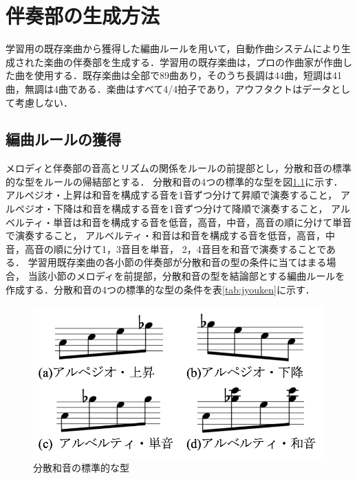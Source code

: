 \chapter{伴奏部の生成方法}
学習用の既存楽曲から獲得した編曲ルールを用いて，自動作曲システムにより生成された楽曲の伴奏部を生成する．学習用の既存楽曲は，プロの作曲家が作曲した曲を使用する．既存楽曲は全部で89曲あり，そのうち長調は44曲，短調は41曲，無調は4曲である．楽曲はすべて4/4拍子であり，アウフタクトはデータとして考慮しない．

\section{編曲ルールの獲得}
メロディと伴奏部の音高とリズムの関係をルールの前提部とし，分散和音の標準的な型をルールの帰結部とする．
分散和音の4つの標準的な型を図\ref{fig:type}に示す．アルペジオ・上昇は和音を構成する音を1音ずつ分けて昇順で演奏すること，
アルペジオ・下降は和音を構成する音を1音ずつ分けて降順で演奏すること，
アルベルティ・単音は和音を構成する音を低音，高音，中音，高音の順に分けて単音で演奏すること，
アルベルティ・和音は和音を構成する音を低音，高音，中音，高音の順に分けて1，3音目を単音，
2，4音目を和音で演奏することである．
学習用既存楽曲の各小節の伴奏部が分散和音の型の条件に当てはまる場合，
当該小節のメロディを前提部，分散和音の型を結論部とする編曲ルールを作成する．分散和音の4つの標準的な型の条件を表\ref{tab:jyouken}に示す．


\begin{figure}[htb]
  \centering
  \includegraphics[scale=0.6]{image/type.png}
  \caption{分散和音の標準的な型}
  \label{fig:type}
\end{figure}

\newpage

